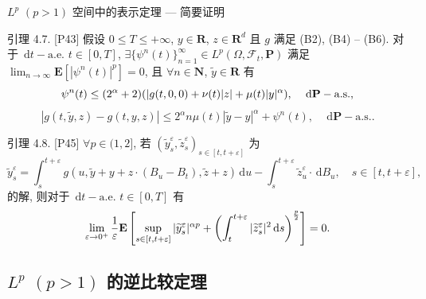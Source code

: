 \documentclass[xcolor=svgnames,serif,table,10pt]{beamer}
\newcommand{\rtn}{\mathrm{\mathbf{R}}}
\newcommand{\N}{\mathrm{\mathbf{N}}}
\newcommand{\As}{\mathrm{a.s.}}
\newcommand{\Ae}{\mathrm{a.e.}}
\newcommand*{\PR}{\mathrm{\mathbf{P}}}
\newcommand{\EXlr}[1]{\mathrm{\mathbf{E}}\left[#1\right]}
\newcommand*{\dif}{\,\mathrm{d}}
\newcommand*{\F}{\mathcal{F}}
\newcommand*{\prs}{\dif\PR-\As}
\newcommand*{\dte}{\dif t-\Ae}
\newcommand{\tT}[1][0]{[#1,T]}
\newcommand{\intT}[2][T]{\int^{#1}_{#2}}
\newcommand{\intTe}[1][t]{\intT[t+\varepsilon]{#1}}
\begin{document}
\begin{frame}[t]{$L^p$ $(p>1)$ 空间中的表示定理 --- 简要证明}
\vspace{-2ex}\small
  \begin{block}{引理 4.7. [P43]}
    \qquad 假设 $0\leq T\leq+\infty$, $y\in\rtn$, $z\in\rtn^d$ 且 $g$ 满足 (B2),
    (B4) -- (B6). 对于 $\dte$ $t\in\tT$,
    $\exists\{\psi^n(t)\}^\infty_{n=1}\in L^{p}(\Omega,\F_t,\PR)$ 满足
    $\lim_{n\to\infty}\EXlr{|\psi^n(t)|^{p}}=0$, 且
    $\forall n\in\N$, $\widetilde y\in\rtn$ 有
    \vspace{-.8ex}
    \begin{equation*}
      \psi^n(t)\leq (2^\alpha+2)(|g(t,0,0)+\nu(t)|z|+\mu(t)|y|^\alpha),\quad\prs,\vspace{-.5ex}
    \end{equation*}
    \begin{equation*}
      |g(t,\widetilde y,z)-g(t,y,z)|\leq2^\alpha n\mu(t)|\widetilde y-y|^\alpha+\psi^n(t), \quad\prs.
    \end{equation*}
  \end{block}
  \vspace{-.5ex}
  \begin{block}{引理 4.8. [P45]}
    \qquad $\forall p\in(1,2]$, 若 $(\widetilde{y}^\varepsilon_s,\widetilde{z}^\varepsilon_s)_{s\in[t,t+\varepsilon]}$
    为%
    \begin{equation*}
      \widetilde{y}^\varepsilon_s=
      \intTe[s]g(u,\widetilde y+y+z\cdot(B_u-B_t),\widetilde z+z)\dif u
      -\intTe[s]\widetilde{z}^\varepsilon_u\cdot\dif B_u, \quad s\in[t,t+\varepsilon],%
    \end{equation*}
    的解, 则对于 $\dte$ $t\in\tT$ 有%
    \begin{equation*}
      \lim_{\varepsilon\to0^+}\frac{1}{\varepsilon}
      \EXlr{\sup_{s\in[t,t+\varepsilon]}|\widetilde{y}^\varepsilon_s|^{\alpha p}
        +\left(
           \intTe|\widetilde z^\varepsilon_s|^2\dif s
         \right)^{p\over 2}}=0.
    \end{equation*}
  \end{block}
\end{frame}

\subsection{$L^p$ $(p>1)$ 的逆比较定理}
\end{document}
